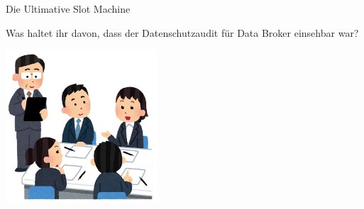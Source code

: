 \begin{frame}{Die Ultimative Slot Machine}
	\centering


	\Large
	Was haltet ihr davon, dass der Datenschutzaudit für Data Broker einsehbar war?

	\includegraphics[width=0.425\textwidth]{images/discussion.png}
\end{frame}
